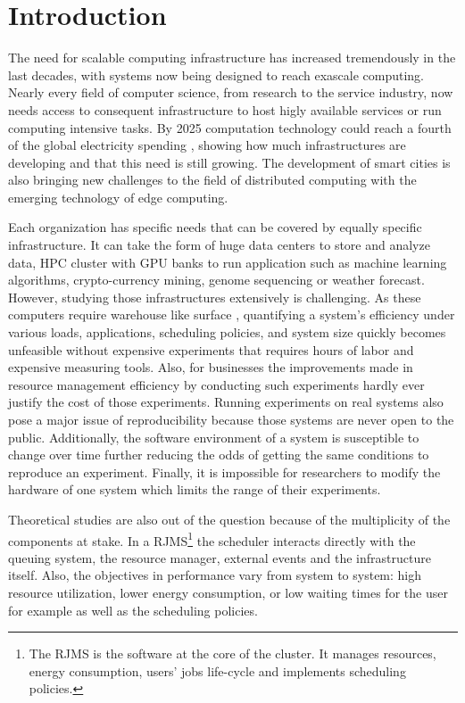 \chapter{Introduction}

The need for scalable computing infrastructure has increased tremendously in
the last decades, with systems now being designed to reach exascale computing.
Nearly every field of computer science, from research to the service industry,
now needs access to consequent infrastructure to host higly available services
or run computing intensive tasks. By 2025 computation technology could reach a
fourth of the global electricity spending \cite{andrae2017total}, showing how
much infrastructures are developing and that this need is still growing. The
development of smart cities is also bringing new challenges to the field of
distributed computing with the emerging technology of edge computing.

Each organization has specific needs that can be covered by equally specific infrastructure.
It can take the form of huge data centers to store and analyze data, HPC
cluster with GPU banks to run application such as machine learning algorithms,
crypto-currency mining, genome sequencing or weather forecast.  However,
studying those infrastructures extensively is challenging.  As these computers
require warehouse like surface \cite{barroso2018datacenter}, quantifying a
system's efficiency under various loads, applications, scheduling policies, and
system size quickly becomes unfeasible without expensive experiments that
requires hours of labor and expensive measuring tools. Also, for businesses the
improvements made in resource management efficiency by conducting such
experiments hardly ever justify the cost of those experiments. Running
experiments on real systems also pose a major issue of reproducibility because
those systems are never open to the public. Additionally, the software
environment of a system is susceptible to change over time further reducing the
odds of getting the same conditions to reproduce an experiment. Finally, it is
impossible for researchers to modify the hardware of one system which limits
the range of their experiments.

Theoretical studies are also out of the question because of the multiplicity of
the components at stake. In a RJMS\footnote{The RJMS is the software at the
core of the cluster. It manages resources, energy consumption, users' jobs
life-cycle and implements scheduling policies.} the scheduler interacts
directly with the queuing system, the resource manager, external events and the
infrastructure itself. Also, the objectives in performance vary from system to
system: high resource utilization, lower energy consumption, or low waiting
times for the user for example as well as the scheduling policies. \\

